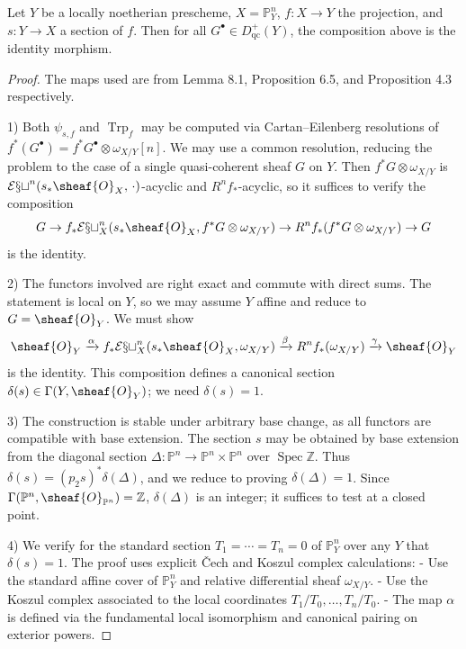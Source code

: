 \begin{proposition}
Let $Y$ be a locally noetherian prescheme, $X=\mathbb{P}_Y^n$, $f\colon X\to Y$ the projection, and $s\colon Y\to X$ a section of $f$. Then for all $G^\bullet\in D_{\mathrm{qc}}^+(Y)$, the composition above is the identity morphism.
\end{proposition}
\begin{proof}
The maps used are from Lemma 8.1, Proposition 6.5, and Proposition 4.3 respectively.

1) Both $\psi_{s,f}$ and $\operatorname{Trp}_f$ may be computed via Cartan--Eilenberg resolutions of $f^*(G^\bullet)=f^*G^\bullet\otimes\omega_{X/Y}[n]$. We may use a common resolution, reducing the problem to the case of a single quasi-coherent sheaf $G$ on $Y$. Then $f^*G\otimes\omega_{X/Y}$ is $\mathcal{Ext}^n(s_*\sheaf{O}_X,\,\cdot)$-acyclic and $R^nf_*$-acyclic, so it suffices to verify the composition
\[
G \to f_*\mathcal{Ext}^n_X(s_*\sheaf{O}_X,f^*G\otimes\omega_{X/Y})
\to R^nf_*(f^*G\otimes\omega_{X/Y})
\to G
\]
is the identity.

\setcounter{page}{201}
2) The functors involved are right exact and commute with direct sums. The statement is local on $Y$, so we may assume $Y$ affine and reduce to $G=\sheaf{O}_Y$. We must show
\[
\sheaf{O}_Y \xrightarrow{\alpha}
f_*\mathcal{Ext}^n_X(s_*\sheaf{O}_X,\omega_{X/Y})
\xrightarrow{\beta}
R^nf_*(\omega_{X/Y})
\xrightarrow{\gamma}
\sheaf{O}_Y
\]
is the identity. This composition defines a canonical section $\delta(s)\in\Gamma(Y,\sheaf{O}_Y)$; we need $\delta(s)=1$.

3) The construction is stable under arbitrary base change, as all functors are compatible with base extension. The section $s$ may be obtained by base extension from the diagonal section $\Delta\colon\mathbb{P}^n\to\mathbb{P}^n\times\mathbb{P}^n$ over $\operatorname{Spec}\mathbb{Z}$. Thus $\delta(s)=(p_2s)^*\delta(\Delta)$, and we reduce to proving $\delta(\Delta)=1$. Since $\Gamma(\mathbb{P}^n,\sheaf{O}_{\mathbb{P}^n})=\mathbb{Z}$, $\delta(\Delta)$ is an integer; it suffices to test at a closed point.

\setcounter{page}{202}
4) We verify for the standard section $T_1=\cdots=T_n=0$ of $\mathbb{P}_Y^n$ over any $Y$ that $\delta(s)=1$. The proof uses explicit Čech and Koszul complex calculations:
- Use the standard affine cover of $\mathbb{P}_Y^n$ and relative differential sheaf $\omega_{X/Y}$.
- Use the Koszul complex associated to the local coordinates $T_1/T_0,\dots,T_n/T_0$.
- The map $\alpha$ is defined via the fundamental local isomorphism and canonical pairing on exterior powers.


\end{proof}
